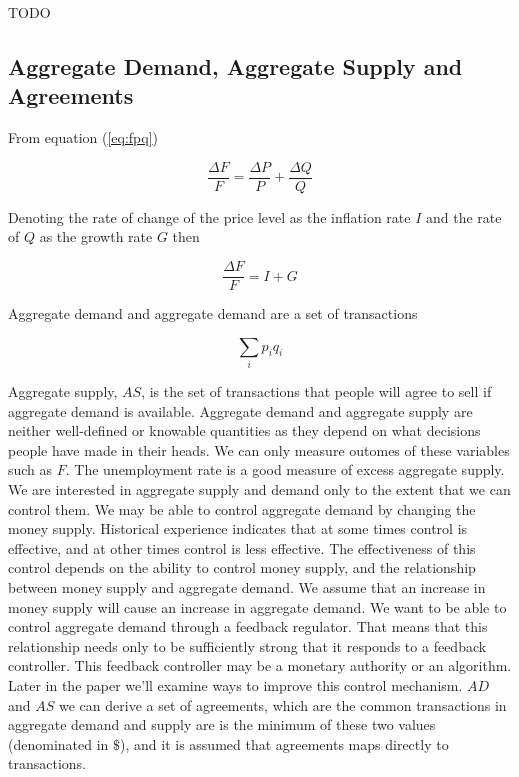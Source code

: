 TODO

\subsection{Aggregate Demand, Aggregate Supply and Agreements}

From equation (\ref{eq:fpq})

\[ \frac {\Delta F} F = \frac {\Delta P} P + \frac {\Delta Q} Q \]

Denoting the rate of change of the price level as the inflation rate $I$ and the rate of $Q$ as the
growth rate $G$ then

\begin{equation}
    \label{equation:fig}
    \frac {\Delta F} F = I + G
\end{equation}

Aggregate demand and aggregate demand are a set of transactions

\begin{equation}
    \sum_i p_i q_i
\end{equation}

Aggregate supply, $AS$, is the set of transactions that people will agree to sell if aggregate
demand is available. Aggregate demand and aggregate supply are neither well-defined or knowable
quantities as they depend on what decisions people have made in their heads. We can only measure
outomes of these variables such as $F$. The unemployment rate is a good measure of excess aggregate
supply. We are interested in aggregate supply and demand only to the extent that we can control
them. We may be able to control aggregate demand by changing the money supply. Historical experience
indicates that at some times control is effective, and at other times control is less effective. The
effectiveness of this control depends on the ability to control money supply, and the relationship
between money supply and aggregate demand. We assume that an increase in money supply will cause an
increase in aggregate demand. We want to be able to control aggregate demand through a feedback
regulator. That means that this relationship needs only to be sufficiently strong that it responds
to a feedback controller. This feedback controller may be a monetary authority or an algorithm.
Later in the paper we'll examine ways to improve this control mechanism. $AD$ and $AS$ we can derive
a set of agreements, which are the common transactions in aggregate demand and supply are is the
minimum of these two values (denominated in $\$$), and it is assumed that agreements maps directly
to transactions.

